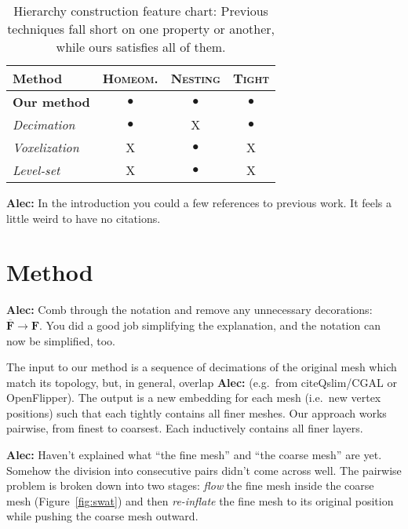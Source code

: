 \documentclass{cgyrf15}
\newcommand{\ra}[1]{\renewcommand{\arraystretch}{#1}}
\newcommand{\NO}{{\color{red}\textsf{X}}}
\newcommand{\YES}{$\bullet$}
\newcommand{\alec}[1]{{\textcolor[rgb]{0.1,0.6,0.1}{\textbf{Alec:} #1}}}
\begin{document}
\begin{table}
\centering
\ra{1.2}
\setlength{\tabcolsep}{5.5pt}
\begin{tabularx}{\linewidth}{X c c c}
\rowcolor{white}
\toprule
Method               & \textsc{Homeom.} & \textsc{Nesting}& \textsc{Tight} \\
\midrule                                                                       
\textbf{Our method}  & \YES                  & \YES            & \YES           \\
\emph{Decimation}                                                               
                     & \YES                  & \NO             & \YES           \\
\emph{Voxelization}                                                             
                     & \NO                   & \YES            & \NO            \\
\emph{Level-set}                                                                
                     & \NO                   & \YES            & \NO            \\
\bottomrule
\end{tabularx}
\caption{Hierarchy construction feature chart: Previous techniques fall short
on one property or another, while ours satisfies all of them.}
\label{tab:feature-chart}
\end{table}

\alec{In the introduction you could a few references to previous work. It feels
a little weird to have no citations.}

\section{Method}

\alec{Comb through the notation and remove any unnecessary decorations:
$\overline{\mathbf{F}} \rightarrow \mathbf{F}$. You did a good job simplifying
the explanation, and the notation can now be simplified, too.}

The input to our method is a sequence of decimations of the original mesh which
match its topology, but, in general, overlap \alec{(e.g.\ from
citeQslim/CGAL or OpenFlipper)}. The output is a new embedding for
each mesh (i.e.\ new vertex positions) such that each tightly contains all finer
meshes. Our approach works pairwise, from finest to coarsest. Each
inductively contains all finer layers.

\alec{Haven't explained what ``the fine mesh'' and ``the coarse mesh'' are yet.
Somehow the division into consecutive pairs didn't come across well.}
The pairwise problem is broken down into two stages: \emph{flow} the fine mesh
inside the coarse mesh  (Figure~\ref{fig:swat}) and then \emph{re-inflate} the
fine mesh to its original position while pushing the coarse mesh outward.
\end{document}
